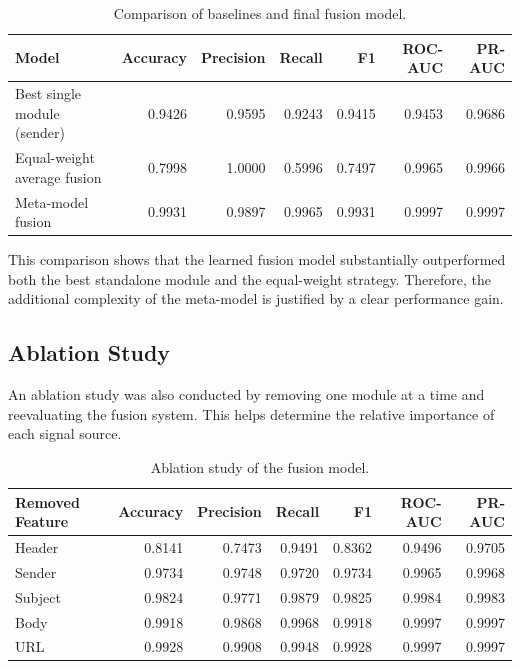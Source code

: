 \begin{table}[h]
\centering
\begin{tabular}{lrrrrrr}
\hline
\textbf{Model} & \textbf{Accuracy} & \textbf{Precision} & \textbf{Recall} & \textbf{F1} & \textbf{ROC-AUC} & \textbf{PR-AUC} \\
\hline
Best single module (sender) & 0.9426 & 0.9595 & 0.9243 & 0.9415 & 0.9453 & 0.9686 \\
Equal-weight average fusion & 0.7998 & 1.0000 & 0.5996 & 0.7497 & 0.9965 & 0.9966 \\
Meta-model fusion & 0.9931 & 0.9897 & 0.9965 & 0.9931 & 0.9997 & 0.9997 \\
\hline
\end{tabular}
\caption{Comparison of baselines and final fusion model.}
\label{tab:baselines}
\end{table}

This comparison shows that the learned fusion model substantially outperformed both the best standalone module and the equal-weight strategy. Therefore, the additional complexity of the meta-model is justified by a clear performance gain.

\subsection{Ablation Study}
An ablation study was also conducted by removing one module at a time and reevaluating the fusion system. This helps determine the relative importance of each signal source.

\begin{table}[h]
\centering
\begin{tabular}{lrrrrrr}
\hline
\textbf{Removed Feature} & \textbf{Accuracy} & \textbf{Precision} & \textbf{Recall} & \textbf{F1} & \textbf{ROC-AUC} & \textbf{PR-AUC} \\
\hline
Header & 0.8141 & 0.7473 & 0.9491 & 0.8362 & 0.9496 & 0.9705 \\
Sender & 0.9734 & 0.9748 & 0.9720 & 0.9734 & 0.9965 & 0.9968 \\
Subject & 0.9824 & 0.9771 & 0.9879 & 0.9825 & 0.9984 & 0.9983 \\
Body & 0.9918 & 0.9868 & 0.9968 & 0.9918 & 0.9997 & 0.9997 \\
URL & 0.9928 & 0.9908 & 0.9948 & 0.9928 & 0.9997 & 0.9997 \\
\hline
\end{tabular}
\caption{Ablation study of the fusion model.}
\label{tab:ablation}
\end{table}


